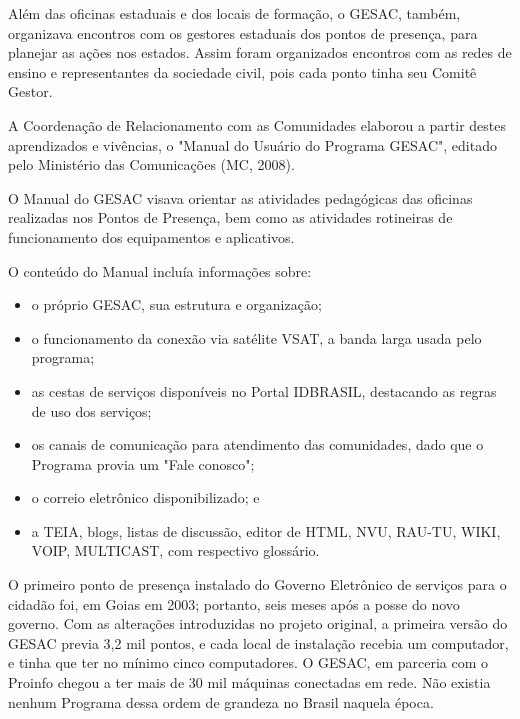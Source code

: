 Além das oficinas estaduais e dos locais de formação, o GESAC, também, organizava encontros com os gestores estaduais dos pontos de presença, para planejar as ações nos estados. Assim foram organizados encontros com as redes de ensino e  representantes da sociedade civil, pois cada ponto  tinha seu Comitê Gestor.

A Coordenação de Relacionamento com as Comunidades elaborou a partir destes aprendizados e vivências, o "Manual do Usuário do Programa GESAC", editado pelo Ministério das Comunicações (MC, 2008).

O Manual do GESAC visava  orientar as atividades pedagógicas das oficinas realizadas nos Pontos de Presença, bem como as  atividades rotineiras de funcionamento dos equipamentos e aplicativos.

O conteúdo do Manual incluía informações sobre:


\begin{itemize}
\item o próprio GESAC, sua estrutura e organização;
\item o funcionamento da conexão via satélite VSAT, a banda larga usada pelo programa;
\item as cestas de serviços disponíveis no Portal IDBRASIL, destacando as regras de uso dos serviços;
\item os canais de comunicação para atendimento das comunidades, dado que o Programa provia um "Fale conosco";
\item  o correio eletrônico disponibilizado; e
\item a TEIA, blogs, listas de discussão, editor de HTML, NVU, RAU-TU, WIKI, VOIP, MULTICAST, com respectivo glossário.
\end{itemize}


\noindent\begin{center}\mbox{\centering{}}\end{center}


O primeiro ponto de presença instalado do Governo Eletrônico de serviços para o cidadão foi, em Goias em 2003; portanto, seis meses após a posse do novo governo. Com as alterações introduzidas no projeto original, a primeira versão do GESAC previa 3,2 mil pontos, e cada local de instalação recebia um computador, e tinha que ter no mínimo cinco computadores. O GESAC, em parceria com o Proinfo chegou a ter mais de 30 mil máquinas conectadas em rede. Não existia nenhum Programa dessa ordem de grandeza no Brasil naquela época.

